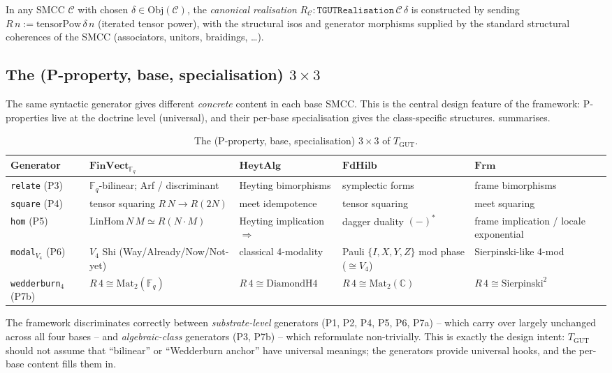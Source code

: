 \documentclass[11pt,a4paper]{article}
\theoremstyle{plain}
\theoremstyle{definition}
\theoremstyle{remark}
\newcommand{\F}{\mathbb{F}}
\newcommand{\C}{\mathbb{C}}
\newcommand{\cat}[1]{\mathbf{#1}}
\newcommand{\HeytAlg}{\cat{HeytAlg}}
\newcommand{\FdHilb}{\cat{FdHilb}}
\newcommand{\Frm}{\cat{Frm}}
\newcommand{\FinVect}{\cat{FinVect}}
\newcommand{\Mat}{\mathrm{Mat}}
\newcommand{\Ob}{\mathrm{Obj}}
\newcommand{\TGUT}{T_{\mathrm{GUT}}}
\newcommand{\DiamondH}{\mathrm{DiamondH4}}
\newcommand{\Sierp}{\mathrm{Sierpinski}}
\newcommand{\tensorPow}{\mathrm{tensorPow}}
\newcommand{\smcc}{SMCC}
\begin{document}
In any \smcc{} $\mathcal{C}$ with chosen $\delta \in \Ob(\mathcal{C})$, the \emph{canonical realisation} $R_{\mathcal{C}} : \mathtt{TGUTRealisation}\,\mathcal{C}\,\delta$ is constructed by sending $R\,n := \tensorPow\,\delta\,n$ (iterated tensor power), with the structural isos and generator morphisms supplied by the standard structural coherences of the \smcc{} (associators, unitors, braidings, \dots).

\subsection{The (P-property, base, specialisation) $3 \times 3$}\label{sec:tgut:matrix}

The same syntactic generator gives different \emph{concrete} content in each base \smcc. This is the central design feature of the framework: P-properties live at the doctrine level (universal), and their per-base specialisation gives the class-specific structures.  summarises.

\begin{table}[h!]
\centering
\scriptsize
\begin{tabular}{p{2cm}p{2.7cm}p{2.7cm}p{2.7cm}p{2.7cm}}
\toprule
Generator & $\FinVect_{\F_q}$ & $\HeytAlg$ & $\FdHilb$ & $\Frm$ \\
\midrule
\texttt{relate} (P3) & $\F_q$-bilinear; Arf / discriminant & Heyting bimorphisms & symplectic forms & frame bimorphisms \\
\texttt{square} (P4) & tensor squaring $R\,N \to R(2N)$ & meet idempotence & tensor squaring & meet squaring \\
\texttt{hom} (P5) & $\mathrm{LinHom}\,N\,M \simeq R(N\cdot M)$ & Heyting implication $\Rightarrow$ & dagger duality $(-)^*$ & frame implication / locale exponential \\
\texttt{modal}$_{V_4}$ (P6) & $V_4$ Shi (Way/Already/Now/Not-yet) & classical 4-modality & Pauli $\{I, X, Y, Z\}$ mod phase ($\cong V_4$) & Sierpinski-like 4-mod \\
\texttt{wedderburn}$_4$ (P7b) & $R\,4 \cong \Mat_2(\F_q)$ & $R\,4 \cong \DiamondH$ & $R\,4 \cong \Mat_2(\C)$ & $R\,4 \cong \Sierp^2$ \\
\bottomrule
\end{tabular}
\caption{The (P-property, base, specialisation) $3 \times 3$ of $\TGUT$.}\label{tab:specialisation}
\end{table}

The framework discriminates correctly between \emph{substrate-level} generators (P1, P2, P4, P5, P6, P7a) -- which carry over largely unchanged across all four bases -- and \emph{algebraic-class} generators (P3, P7b) -- which reformulate non-trivially. This is exactly the design intent: $\TGUT$ should not assume that ``bilinear'' or ``Wedderburn anchor'' have universal meanings; the generators provide universal hooks, and the per-base content fills them in.
\end{document}
